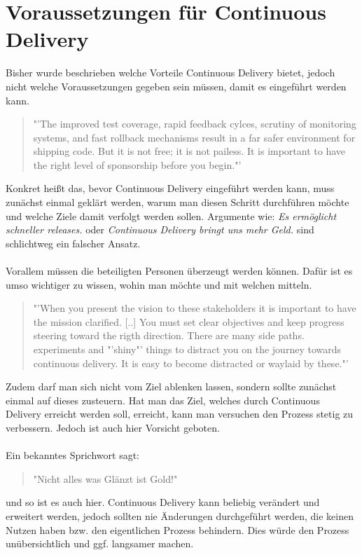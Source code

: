 \section{Voraussetzungen für Continuous Delivery}
\label{sec:VoraussetzungenCD}
Bisher wurde beschrieben welche Vorteile Continuous Delivery bietet, jedoch nicht welche Voraussetzungen gegeben sein müssen, damit es eingeführt werden kann.

\begin{quote}
	"'The improved test coverage, rapid feedback cylces, scrutiny of monitoring systems, and fast rollback mechanisms result in a far safer environment for shipping code. But it is not free; it is not pailess. It is important to have the right level of sponsorship before you begin."'\cite{RallySofware2013}
\end{quote}
Konkret heißt das, bevor Continuous Delivery eingeführt werden kann, muss zunächst einmal geklärt werden, warum man diesen Schritt durchführen möchte und welche Ziele damit verfolgt werden sollen. Argumente wie: \textit{Es ermöglicht schneller releases.} oder \textit{Continuous Delivery bringt uns mehr Geld.} sind schlichtweg ein falscher Ansatz.
\\\\
Vorallem müssen die beteiligten Personen überzeugt werden können. Dafür ist es umso wichtiger zu wissen, wohin man möchte und mit welchen mitteln.

\begin{quote}
	"'When you present the vision to these stakeholders it is important to have the mission clarified. [..] You must set clear objectives and keep progress steering toward the rigth direction. There are many side paths. experiments and "'shiny"' things to distract you on the journey towards continuous delivery. It is easy to become distracted or waylaid by these."'\cite{RallySofware2013}
\end{quote} 
Zudem darf man sich nicht vom Ziel ablenken lassen, sondern sollte zunächst einmal auf dieses zusteuern. Hat man das Ziel, welches durch Continuous Delivery erreicht werden soll, erreicht, kann man versuchen den Prozess stetig zu verbessern. Jedoch ist auch hier Vorsicht geboten.
\\\\
Ein bekanntes Sprichwort sagt: 
\begin{quotation}
	"Nicht alles was Glänzt ist Gold!"
\end{quotation}
und so ist es auch hier. Continuous Delivery kann beliebig verändert und erweitert werden, jedoch sollten nie Änderungen durchgeführt werden, die keinen Nutzen haben bzw. den eigentlichen Prozess behindern. Dies würde den Prozess unübersichtlich und ggf. langsamer machen.

